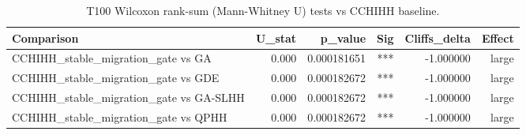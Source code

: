 \begin{table}[htbp]
\centering
\caption{T100 Wilcoxon rank-sum (Mann-Whitney U) tests vs CCHIHH baseline.}
\label{tab:t100_wilcoxon_rank_sum}
\begin{tabular}{lrrrrr}
\toprule
Comparison & U_stat & p_value & Sig & Cliffs_delta & Effect \\
\midrule
CCHIHH\_stable\_migration\_gate vs GA & 0.000 & 0.000181651 & *** & -1.000000 & large \\
CCHIHH\_stable\_migration\_gate vs GDE & 0.000 & 0.000182672 & *** & -1.000000 & large \\
CCHIHH\_stable\_migration\_gate vs GA-SLHH & 0.000 & 0.000182672 & *** & -1.000000 & large \\
CCHIHH\_stable\_migration\_gate vs QPHH & 0.000 & 0.000182672 & *** & -1.000000 & large \\
\bottomrule
\end{tabular}
\end{table}
